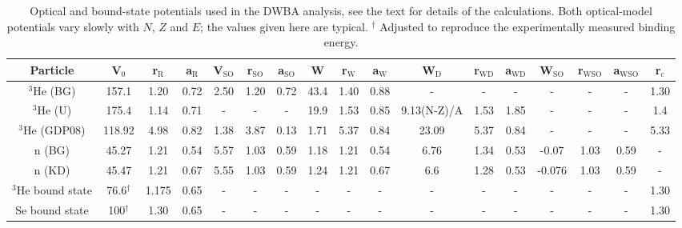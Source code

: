 \begin{table}\footnotesize
\caption{\label{tab:typicalPotentials} Optical and bound-state potentials used in the DWBA analysis, see the text for details of the calculations. Both optical-model potentials vary slowly with $N$, $Z$ and $E$; the values given here are typical. $^{\dagger}$ Adjusted to reproduce the experimentally measured binding energy.}
\begin{tabular}{ccccccccccccccccc}
\hline
Particle & V$_0$ & r$_{\text{R}}$ & a$_{\text{R}}$ & V$_{\text{SO}}$ & r$_{\text{SO}}$ & a$_{\text{SO}}$ & W & r$_{\text{W}}$ & a$_{\text{W}}$ & W$_{\text{D}}$ & r$_{\text{WD}}$ & a$_{\text{WD}}$ & W$_{\text{SO}}$ & r$_{\text{WSO}}$ & a$_{\text{WSO}}$ & r$_{\text{c}}$ \\
\hline
$^{3}$He (BG) & 157.1 & 1.20 & 0.72 & 2.50 & 1.20 & 0.72 & 43.4 & 1.40 & 0.88 & - & - & - & - & - & - & 1.30\\
$^{3}$He (U) & 175.4 & 1.14 & 0.71 & - & - & - & 19.9 & 1.53 & 0.85 & 9.13(N-Z)/A & 1.53 & 1.85 & - & - & - & 1.4\\
$^{3}$He (GDP08) & 118.92 & 4.98 & 0.82 & 1.38 & 3.87 & 0.13 & 1.71 & 5.37 & 0.84 & 23.09 & 5.37 & 0.84 & - & - & - & 5.33\\

n (BG) & 45.27 & 1.21 & 0.54 & 5.57 & 1.03 & 0.59 & 1.18 & 1.21 & 0.54 & 6.76 & 1.34 & 0.53 & -0.07 & 1.03 & 0.59 & -\\
n (KD) & 45.47 & 1.21 & 0.67 & 5.55 & 1.03 & 0.59 & 1.24 & 1.21 & 0.67 & 6.6 & 1.28 & 0.53 & -0.076 & 1.03 & 0.59 & -\\

$^3$He bound state & 76.6$^{\dagger}$ & 1.175 & 0.65 & - & - & - & - & - & - & - & - & - & - & - & - & 1.30\\

Se bound state & 100$^{\dagger}$ & 1.30 & 0.65 & - & - & - & - & - & - & - & - & - & - & - & - & 1.30\\
\hline
\end{tabular}
\end{table}

